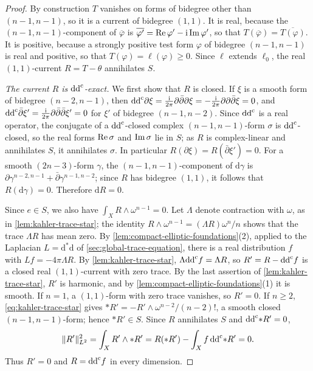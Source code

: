 \begin{proof}
By construction $T$ vanishes on forms of bidegree other than $(n-1,n-1)$, so it is a current of bidegree $(1,1)$. It is real, because the $(n-1,n-1)$-component of $\overline\varphi$ is $\overline{\varphi'}=\operatorname{Re}\varphi'-\mathrm i\operatorname{Im}\varphi'$, so that $T(\overline\varphi)=\overline{T(\varphi)}$. It is positive, because a strongly positive test form $\varphi$ of bidegree $(n-1,n-1)$ is real and positive, so that $T(\varphi)=\ell(\varphi)\geq0$. Since $\ell$ extends $\ell_0$, the real $(1,1)$-current $R=T-\theta$ annihilates $S$.

\emph{The current $R$ is $\mathrm{dd}^{\mathrm{c}}$-exact.} We first show that $R$ is closed. If $\xi$ is a smooth form of bidegree $(n-2,n-1)$, then $\mathrm{dd}^{\mathrm{c}}\partial\xi=\frac{\mathrm i}{2\pi}\partial\bar\partial\partial\xi=-\frac{\mathrm i}{2\pi}\partial\partial\bar\partial\xi=0$, and $\mathrm{dd}^{\mathrm{c}}\bar\partial\xi'=\frac{\mathrm i}{2\pi}\partial\bar\partial\bar\partial\xi'=0$ for $\xi'$ of bidegree $(n-1,n-2)$. Since $\mathrm{dd}^{\mathrm{c}}$ is a real operator, the conjugate of a $\mathrm{dd}^{\mathrm{c}}$-closed complex $(n-1,n-1)$-form $\sigma$ is $\mathrm{dd}^{\mathrm{c}}$-closed, so the real forms $\operatorname{Re}\sigma$ and $\operatorname{Im}\sigma$ lie in $S$; as $R$ is complex-linear and annihilates $S$, it annihilates $\sigma$. In particular $R(\partial\xi)=R(\bar\partial\xi')=0$. For a smooth $(2n-3)$-form $\gamma$, the $(n-1,n-1)$-component of $\mathrm d\gamma$ is $\partial\gamma^{n-2,n-1}+\bar\partial\gamma^{n-1,n-2}$; since $R$ has bidegree $(1,1)$, it follows that $R(\mathrm d\gamma)=0$. Therefore $\mathrm dR=0$.

Since $e\in S$, we also have $\int_XR\wedge\omega^{n-1}=0$. Let $\Lambda$ denote contraction with $\omega$, as in \cref{lem:kahler-trace-star}; the identity $R\wedge\omega^{n-1}=(\Lambda R)\omega^n/n$ shows that the trace $\Lambda R$ has mean zero. By \cref{lem:compact-elliptic-foundations}(2), applied to the Laplacian $L=\mathrm d^*\mathrm d$ of \cref{sec:global-trace-equation}, there is a real distribution $f$ with $Lf=-4\pi\Lambda R$. By \cref{lem:kahler-trace-star}, $\Lambda\mathrm{dd}^{\mathrm{c}} f=\Lambda R$, so $R'=R-\mathrm{dd}^{\mathrm{c}} f$ is a closed real $(1,1)$-current with zero trace. By the last assertion of \cref{lem:kahler-trace-star}, $R'$ is harmonic, and by \cref{lem:compact-elliptic-foundations}(1) it is smooth. If $n=1$, a $(1,1)$-form with zero trace vanishes, so $R'=0$. If $n\geq2$, \eqref{eq:kahler-trace-star} gives $*R'=-R'\wedge\omega^{n-2}/(n-2)!$, a smooth closed $(n-1,n-1)$-form; hence $*R'\in S$. Since $R$ annihilates $S$ and $\mathrm{dd}^{\mathrm{c}}{*R'}=0$,
\[
 \|R'\|_{L^2}^2
   =\int_XR'\wedge *R'
   =R(*R')-\int_Xf\,\mathrm{dd}^{\mathrm{c}}{*R'}=0.
\]
Thus $R'=0$ and $R=\mathrm{dd}^{\mathrm{c}} f$ in every dimension.


\end{proof}

